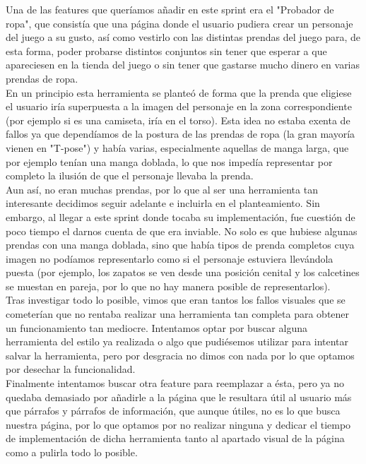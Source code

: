 Una de las features que queríamos añadir en este sprint era el "Probador de ropa", que consistía que una página donde el usuario pudiera crear un personaje del juego a su gusto, así como vestirlo con las distintas prendas del juego para, de esta forma, poder probarse distintos conjuntos sin tener que esperar a que apareciesen en la tienda del juego o sin tener que gastarse mucho dinero en varias prendas de ropa.\\

En un principio esta herramienta se planteó de forma que la prenda que eligiese el usuario iría superpuesta a la imagen del personaje en la zona correspondiente (por ejemplo si es una camiseta, iría en el torso). Esta idea no estaba exenta de fallos ya que dependíamos de la postura de las prendas de ropa (la gran mayoría vienen en "T-pose") y había varias, especialmente aquellas de manga larga, que por ejemplo tenían una manga doblada, lo que nos impedía representar por completo la ilusión de que el personaje llevaba la prenda.\\

Aun así, no eran muchas prendas, por lo que al ser una herramienta tan interesante decidimos seguir adelante e incluirla en el planteamiento. Sin embargo, al llegar a este sprint donde tocaba su implementación, fue cuestión de poco tiempo el darnos cuenta de que era inviable. No solo es que hubiese algunas prendas con una manga doblada, sino que había tipos de prenda completos cuya imagen no podíamos representarlo como si el personaje estuviera llevándola puesta (por ejemplo, los zapatos se ven desde una posición cenital y los calcetines se muestan en pareja, por lo que no hay manera posible de representarlos).\\

Tras investigar todo lo posible, vimos que eran tantos los fallos visuales que se cometerían que no rentaba realizar una herramienta tan completa para obtener un funcionamiento tan mediocre. Intentamos optar por buscar alguna herramienta del estilo ya realizada o algo que pudiésemos utilizar para intentar salvar la herramienta, pero por desgracia no dimos con nada por lo que optamos por desechar la funcionalidad.\\

Finalmente intentamos buscar otra feature para reemplazar a ésta, pero ya no quedaba demasiado por añadirle a la página que le resultara útil al usuario más que párrafos y párrafos de información, que aunque útiles, no es lo que busca nuestra página, por lo que optamos por no realizar ninguna y dedicar el tiempo de implementación de dicha herramienta tanto al apartado visual de la página como a pulirla todo lo posible.\\

